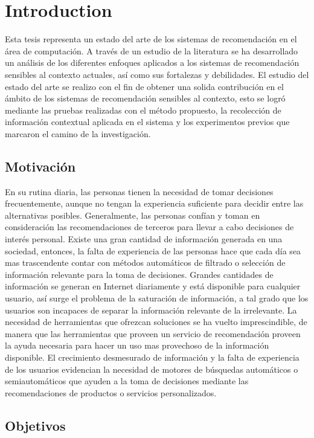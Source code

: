 \chapter{Introduction} \label{introduction} 


Esta tesis representa un estado del arte de los sistemas de
recomendación en el área de computación.  A través de un estudio de la
literatura se ha desarrollado un análisis de los diferentes enfoques
aplicados a los sistemas de recomendación sensibles al contexto
actuales, así como sus fortalezas y debilidades.  El estudio del
estado del arte se realizo con el fin de obtener una solida
contribución en el ámbito de los sistemas de recomendación sensibles
al contexto, esto se logró mediante las pruebas realizadas con el
método propuesto, la recolección de información contextual aplicada en
el sistema y los experimentos previos que marcaron el camino de la
investigación.

\section{Motivación}

En su rutina diaria,  las personas tienen la necesidad de tomar
decisiones frecuentemente, aunque no tengan la experiencia suficiente
para decidir entre las alternativas posibles. Generalmente, las
personas confían y toman en consideración las recomendaciones de
terceros para llevar a cabo decisiones de  interés personal.  Existe
una gran cantidad de información generada en una sociedad,  entonces,
la falta de experiencia de las personas hace que cada día sea mas
trascendente contar con métodos automáticos  de filtrado o selección
de información relevante para la toma de decisiones. Grandes
cantidades de información se generan en Internet diariamente y está
disponible para cualquier usuario, así surge el problema de la
saturación de información,  a tal grado que los usuarios son incapaces
de separar la información relevante de la irrelevante.  La necesidad
de herramientas que ofrezcan soluciones se ha vuelto imprescindible,
de manera que las  herramientas  que proveen un servicio de
recomendación proveen la ayuda necesaria para hacer un uso mas
provechoso de la información disponible. El crecimiento desmesurado de
información y la falta de experiencia de los usuarios evidencian la
necesidad de motores de búsquedas automáticos o semiautomáticos que
ayuden a la toma de decisiones mediante las recomendaciones de
productos o servicios personalizados.

\section{Objetivos}

